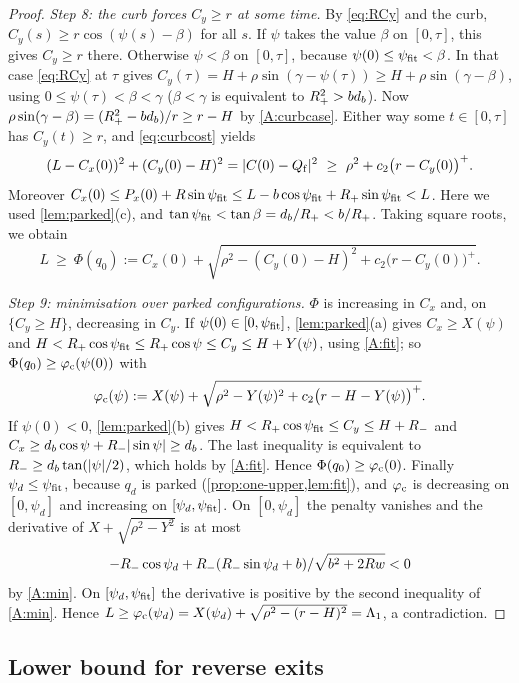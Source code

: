 \begin{proof}
\emph{Step 8: the curb forces $C_y\ge r$ at some time.}
By \eqref{eq:RCy} and the curb, $C_y(s)\ge r\cos(\psi(s)-\beta)$ for all $s$.
If $\psi$ takes the value $\beta$ on $[0,\tau]$, this gives $C_y\ge r$ there.
Otherwise $\psi<\beta$ on $[0,\tau]$, because $\psi(0)\le\psi_{\rm fit}<\beta$.
In that case \eqref{eq:RCy} at $\tau$ gives $C_y(\tau)=H+\rho\sin(\gamma-\psi(\tau))\ge H+\rho\sin(\gamma-\beta)$, using $0\le\psi(\tau)<\beta<\gamma$ ($\beta<\gamma$ is equivalent to $R_{+}^2>bd_b$).
Now $\rho\sin(\gamma-\beta)=(R_{+}^2-bd_b)/r\ge r-H$ by \ref{A:curbcase}.
Either way some $t\in[0,\tau]$ has $C_y(t)\ge r$, and \eqref{eq:curbcost} yields
\[
  (L-C_x(0))^2+(C_y(0)-H)^2=|C(0)-\Qf|^2\ \ge\ \rho^2+c_2\big(r-C_y(0)\big)^+ .
\]
Moreover $C_x(0)\le P_x(0)+R\sin\psi_{\rm fit}\le L-b\cos\psi_{\rm fit}+R_{+}\sin\psi_{\rm fit}<L$.
Here we used \cref{lem:parked}(c), and $\tan\psi_{\rm fit}<\tan\beta=d_b/R_{+}<b/R_{+}$.
Taking square roots, we obtain
\begin{equation}\label{eq:Phi}
  L\ \ge\ \Phi(q_0):=C_x(0)+\sqrt{\rho^2-(C_y(0)-H)^2+c_2\big(r-C_y(0)\big)^+}.
\end{equation}

\emph{Step 9: minimisation over parked configurations.}
$\Phi$ is increasing in $C_x$ and, on $\{C_y\ge H\}$, decreasing in $C_y$.
If $\psi(0)\in[0,\psi_{\rm fit}]$, \cref{lem:parked}(a) gives $C_x\ge X(\psi)$ and $H<R_{+}\cos\psi_{\rm fit}\le R_{+}\cos\psi\le C_y\le H+Y(\psi)$, using \ref{A:fit}; so $\Phi(q_0)\ge\varphi_{\rm c}(\psi(0))$ with
\[
  \varphi_{\rm c}(\psi):=X(\psi)+\sqrt{\rho^2-Y(\psi)^2+c_2\big(r-H-Y(\psi)\big)^+}.
\]
If $\psi(0)<0$, \cref{lem:parked}(b) gives $H<R_{+}\cos\psi_{\rm fit}\le C_y\le H+R_{-}$ and $C_x\ge d_b\cos\psi+R_{-}|\sin\psi|\ge d_b$.
The last inequality is equivalent to $R_{-}\ge d_b\tan(|\psi|/2)$, which holds by \ref{A:fit}.
Hence $\Phi(q_0)\ge\varphi_{\rm c}(0)$.
Finally $\psi_d\le\psi_{\rm fit}$, because $q_d$ is parked (\cref{prop:one-upper,lem:fit}), and $\varphi_{\rm c}$ is decreasing on $[0,\psi_d]$ and increasing on $[\psi_d,\psi_{\rm fit}]$.
On $[0,\psi_d]$ the penalty vanishes and the derivative of $X+\sqrt{\rho^2-Y^2}$ is at most
\[
  -R_{-}\cos\psi_d+R_{-}(R_{-}\sin\psi_d+b)/\sqrt{b^2+2Rw}<0
\]
by \ref{A:min}.
On $[\psi_d,\psi_{\rm fit}]$ the derivative is positive by the second inequality of \ref{A:min}.
Hence $L\ge\varphi_{\rm c}(\psi_d)=X(\psi_d)+\sqrt{\rho^2-(r-H)^2}=\Lambda_1$, a contradiction.
\end{proof}

\subsection{Lower bound for reverse exits}

